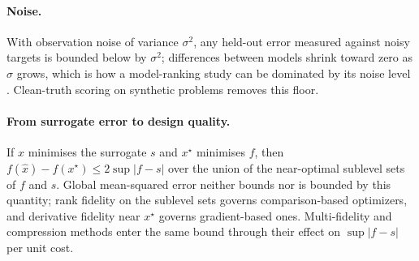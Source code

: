\paragraph{Noise.} With observation noise of variance $\sigma^2$, any held-out error measured against noisy targets is
bounded below by $\sigma^2$; differences between models shrink toward zero as $\sigma$ grows, which is how a model-ranking
study can be dominated by its noise level \cite{lutjens2024climatebench}. Clean-truth scoring on synthetic problems removes
this floor.

\paragraph{From surrogate error to design quality.} If $\hat x$ minimises the surrogate $s$ and $x^\star$ minimises $f$,
then $f(\hat x)-f(x^\star)\le 2\sup|f-s|$ over the union of the near-optimal sublevel sets of $f$ and $s$. Global
mean-squared error neither bounds nor is bounded by this quantity; rank fidelity on the sublevel sets governs
comparison-based optimizers, and derivative fidelity near $x^\star$ governs gradient-based ones. Multi-fidelity and
compression methods enter the same bound through their effect on $\sup|f-s|$ per unit cost.
